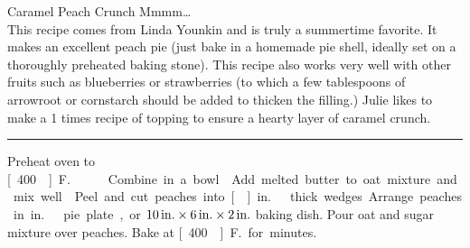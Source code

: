 \begin{recipe}{Caramel Peach Crunch}{}{}
\freeform  Mmmm\ldots\\ This recipe comes from Linda Younkin and is truly a summertime favorite. It makes an excellent peach pie (just bake in a homemade pie shell, ideally set on a thoroughly preheated baking stone). This recipe also works very well with other fruits such as blueberries or strawberries (to which a few tablespoons of arrowroot or cornstarch should be added to thicken the filling.) Julie likes to make a 1  times recipe of topping to ensure a hearty layer of caramel crunch.
\rule{\textwidth}{0.05pt}
\newstep Preheat oven to \unit[400\0]{F.}
Combine in a bowl.
Add melted butter to oat mixture and mix well.
Peel and cut peaches into \unit[]{in.}\ thick wedges.  Arrange peaches in \unit[9]{in.}\ pie plate, or $\unit[10]{in.}\times \unit[6]{in.}\times \unit[2]{in.}$ baking dish.
\newstep Pour oat and sugar mixture over peaches.
\newstep Bake at \unit[400\0]{F.} for \unit[25--30]{minutes}.
\end{recipe}

